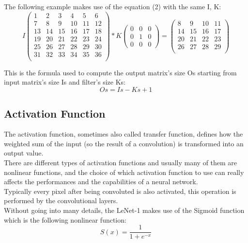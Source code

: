 \documentclass[a4paper]{report}
\begin{document}
The following example makes use of the equation (2) with the same I, K:
\[
I
\left(
\begin{array}{ccccccc}
  1&   2&  3&   4&   5&   6  \\
  7&   8&  9&  10&  11& 12         \\
  13&   14& 15& 16& 17& 18  \\
  19&   20& 21& 22& 23& 24 \\
  25&   26& 27& 28& 29& 30  \\
  31&   32& 33& 34& 35& 36 \\
\end{array}
\right)
*
K
\left(
\begin{array}{ccc}
  0&   0&  0 \\
  0&   1&  0 \\
  0&   0& 0 
\end{array}
\right)
=
\left(
\begin{array}{ccccc}
  8&  9&  10&  11 \\
  14& 15& 16& 17  \\
  20& 21& 22& 23 \\
  26& 27& 28& 29 \\
\end{array}
\right)
\]

This is the formula used to compute the output matrix's size Os starting from input matrix's size Is and filter's size Ks:
\begin{equation} 
\label{outsize}
Os = Is - Ks +1
 \end{equation}

\subsection{Activation Function}
The activation function, sometimes also called transfer function, defines how the weighted sum of the input (so the result of a convolution) is transformed into an output value.\\
There are different types of activation functions and usually many of them are nonlinear functions,  and the choice of which activation function to use can really affects the performances and the capabilities of a neural network.\\
Typically every pixel after being convoluted is also activated, this operation is performed by the convolutional layers.\\
Without going into many details, the LeNet-1 makes use of the Sigmoid function which is the following nonlinear function:
\begin{equation} 
\label{outsize}
S(x) = \frac{1}{1+e^{-x}}
 \end{equation}
 
\end{document}
